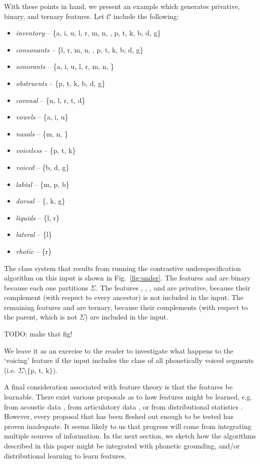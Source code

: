 \documentclass[11pt, oneside]{article}   	%
\begin{document}
\vspace{\baselineskip} With these points in hand, we present an example which generates privative, binary, and ternary features. Let $\mathcal C$ include the following: \begin{itemize}
    \item \textit{inventory} -- \{a, i, u, l, r, m, n, , p, t, k, b, d, g\}
    \item \textit{consonants} -- \{l, r, m, n, , p, t, k, b, d, g\}
    \item \textit{sonorants} -- \{a, i, u, l, r, m, n, \}
    \item \textit{obstruents} -- \{p, t, k, b, d, g\}
    \item \textit{coronal} -- \{n, l, r, t, d\}
    \item \textit{vowels} -- \{a, i, u\}
    \item \textit{nasals} -- \{m, n, \}
    \item \textit{voiceless} -- \{p, t, k\}
    \item \textit{voiced} -- \{b, d, g\}
    \item \textit{labial} -- \{m, p, b\}
    \item \textit{dorsal} -- \{, k, g\}
    \item \textit{liquids} -- \{l, r\}
    \item \textit{lateral} -- \{l\}
    \item \textit{rhotic} -- \{r\}
    \end{itemize}
The class system that results from running the contrastive underspecification algorithm on this input is shown in Fig.~\ref{fig:under}. The features  and  are binary because each one partitions $\Sigma$. The features , , ,  and  are privative, because their complement (with respect to every ancestor) is not included in the input. The remaining features  and  are ternary, because their complements (with respect to the parent, which is not $\Sigma$) are included in the input.

TODO: make that fig!

We leave it as an exercise to the reader to investigate what happens to the `voicing' feature if the input includes the class of all phonetically voiced segments (i.e. $\Sigma \setminus \text{\{p, t, k\}}$).

A final consideration associated with feature theory is that the features be learnable. There exist various proposals as to how features might be learned, e.g. from acoustic data \cite{TODO}, from articulatory data \cite{TODO}, or from distributional statistics \cite{TODO}. However, every proposal that has been fleshed out enough to be tested has proven inadequate. It seems likely to us that progress will come from integrating multiple sources of information. In the next section, we sketch how the algorithms described in this paper might be integrated with phonetic grounding, and/or distributional learning to learn features.
\end{document}
